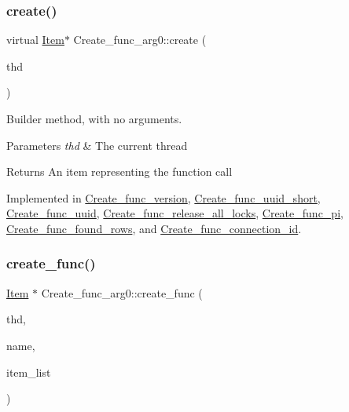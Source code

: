 \subsubsection{\texorpdfstring{create()}{create()}}
{\footnotesize\ttfamily virtual \mbox{\hyperlink{classItem}{Item}}$\ast$ Create\+\_\+func\+\_\+arg0\+::create (\begin{DoxyParamCaption}\item[{T\+HD $\ast$}]{thd }\end{DoxyParamCaption})\hspace{0.3cm}{\ttfamily [pure virtual]}}

Builder method, with no arguments. 
\begin{DoxyParams}{Parameters}
{\em thd} & The current thread \\
\hline
\end{DoxyParams}
\begin{DoxyReturn}{Returns}
An item representing the function call 
\end{DoxyReturn}


Implemented in \mbox{\hyperlink{classCreate__func__version_ab7d76218cc0544bfe347bab6b56f988d}{Create\+\_\+func\+\_\+version}}, \mbox{\hyperlink{classCreate__func__uuid__short_ae69583dfc7846d042e22edba10675898}{Create\+\_\+func\+\_\+uuid\+\_\+short}}, \mbox{\hyperlink{classCreate__func__uuid_a41dab2a321c6cd48b98fe45ecb49866b}{Create\+\_\+func\+\_\+uuid}}, \mbox{\hyperlink{classCreate__func__release__all__locks_a2bbdf262c75f30639a451101c8e182a6}{Create\+\_\+func\+\_\+release\+\_\+all\+\_\+locks}}, \mbox{\hyperlink{classCreate__func__pi_a3d36805732a46676f626b3c3826e05b0}{Create\+\_\+func\+\_\+pi}}, \mbox{\hyperlink{classCreate__func__found__rows_a823602b19114167351b766c354db3f2a}{Create\+\_\+func\+\_\+found\+\_\+rows}}, and \mbox{\hyperlink{classCreate__func__connection__id_a47268542db3c7410575501218c87e6ca}{Create\+\_\+func\+\_\+connection\+\_\+id}}.

\mbox{\label{classCreate__func__arg0_a79ec91336e8f6276501fbc1bc6c30e5e}} 
\subsubsection{\texorpdfstring{create\+\_\+func()}{create\_func()}}
{\footnotesize\ttfamily \mbox{\hyperlink{classItem}{Item}} $\ast$ Create\+\_\+func\+\_\+arg0\+::create\+\_\+func (\begin{DoxyParamCaption}\item[{T\+HD $\ast$}]{thd,  }\item[{L\+E\+X\+\_\+\+S\+T\+R\+I\+NG}]{name,  }\item[{\mbox{\hyperlink{classPT__item__list}{P\+T\+\_\+item\+\_\+list}} $\ast$}]{item\+\_\+list }\end{DoxyParamCaption})\hspace{0.3cm}{\ttfamily [virtual]}}

